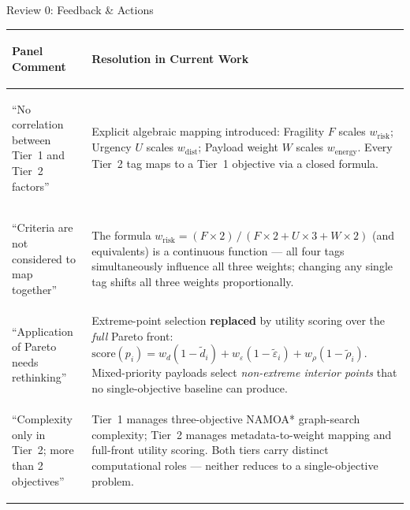 \documentclass[aspectratio=169,11pt]{beamer}
\begin{document}
\begin{frame}{Review 0: Feedback \& Actions}
  \scriptsize
  \begin{tabularx}{\textwidth}{>{\bfseries\raggedright\arraybackslash}p{3.6cm} Y}
    \toprule
    \textbf{Panel Comment} & \textbf{Resolution in Current Work}\\
    \midrule
    ``No correlation between Tier~1 and Tier~2 factors'' &
      Explicit algebraic mapping introduced: Fragility $F$ scales
      $w_\mathrm{risk}$; Urgency $U$ scales $w_\mathrm{dist}$; Payload
      weight $W$ scales $w_\mathrm{energy}$.  Every Tier~2 tag maps to a
      Tier~1 objective via a closed formula.\\[5pt]
    ``Criteria are not considered to map together'' &
      The formula $w_\mathrm{risk}=(F{\times}2)\,/\,(F{\times}2+U{\times}3+W{\times}2)$
      (and equivalents) is a continuous function --- all four tags simultaneously
      influence all three weights; changing any single tag shifts all three weights
      proportionally.\\[5pt]
    ``Application of Pareto needs rethinking'' &
      Extreme-point selection \textbf{replaced} by utility scoring over the
      \emph{full} Pareto front:
      $\mathrm{score}(p_i)=w_d(1{-}\tilde{d}_i)+w_\varepsilon(1{-}\tilde{\varepsilon}_i)+w_\rho(1{-}\tilde{\rho}_i)$.
      Mixed-priority payloads select \emph{non-extreme interior points} that
      no single-objective baseline can produce.\\[5pt]
    ``Complexity only in Tier~2; more than 2 objectives'' &
      Tier~1 manages three-objective NAMOA* graph-search complexity;
      Tier~2 manages metadata-to-weight mapping and full-front utility scoring.
      Both tiers carry distinct computational roles --- neither reduces to a
      single-objective problem.\\
    \bottomrule
  \end{tabularx}
\end{frame}
\end{document}

